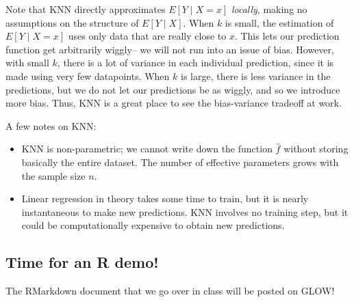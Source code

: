 Note that KNN directly approximates $E[Y \mid X=x]$ \emph{locally}, making no assumptions on the structure of $E[Y \mid X]$. When $k$ is small, the 
estimation of $E[Y \mid X=x]$  uses only data that are really close to $x$. This lets our prediction function get arbitrarily wiggly-- we will not run into an issue of bias. However, with small $k$, there is a lot of variance in each individual prediction, since it is made using very few datapoints. When $k$ is large, there is less variance in the predictions, but we do not let our predictions be as wiggly, and so we introduce more bias. Thus, KNN is a great place to see the bias-variance tradeoff at work. 

A few notes on KNN:
\begin{itemize}
\item KNN is non-parametric; we cannot write down the function $\hat{f}$ without storing basically the entire dataset. The number of effective parameters grows with the sample size $n$. 
\item Linear regression in theory takes some time to train, but it is nearly instantaneous to make new predictions. KNN involves no training step, but it could be computationally expensive to obtain new predictions. 
\end{itemize}


\subsection{Time for an R demo!}

The RMarkdown document that we go over in class will be posted on GLOW! 